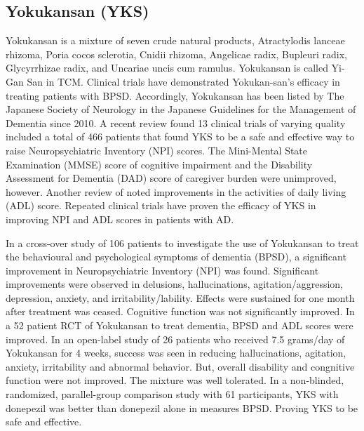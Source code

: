 \documentclass[twocolumn]{article}
\begin{document}

\subsection{Yokukansan (YKS)}
Yokukansan is a mixture of seven crude natural products,
Atractylodis lanceae rhizoma,
Poria cocos sclerotia,
Cnidii rhizoma,
Angelicae radix,
Bupleuri radix,
Glycyrrhizae radix,
and Uncariae uncis cum ramulus.
Yokukansan is called Yi-Gan San in TCM.
\cite{iwasaki2005randomized}
Clinical trials have demonstrated Yokukan-san’s efficacy
in treating patients with BPSD. Accordingly,
Yokukansan has been listed by The Japanese Society of Neurology
in the Japanese Guidelines for the Management of Dementia
since 2010.
A recent review found 13 clinical trials of varying quality
included a total of 466 patients that found YKS to be a safe
and effective way to raise Neuropsychiatric Inventory (NPI) scores.
The Mini-Mental State Examination (MMSE) score of cognitive impairment
and the Disability Assessment for Dementia (DAD) score of caregiver burden
were unimproved, however.
\cite{okamoto2014yokukan}
Another review of noted improvements in the activities of daily living (ADL) score.
\cite{matsuda2013yokukansan}
Repeated clinical trials have proven the efficacy of YKS in improving
NPI and ADL scores in patients with AD.
\cite{mizukami2014kampo}


In a cross-over study of 106 patients to investigate the use of Yokukansan
to treat the behavioural and psychological symptoms of dementia (BPSD),
a significant improvement in
Neuropsychiatric Inventory (NPI) was found.
Significant improvements were observed in delusions,
hallucinations, agitation/aggression, depression, anxiety, and irritability/lability.
Effects were sustained for one month after treatment was ceased.
Cognitive function was not significantly improved.
\cite{mizukami2009randomized}
In a 52 patient RCT of Yokukansan to treat dementia,
BPSD and ADL scores were improved.
\cite{iwasaki2005randomized}
In an open-label study of 26 patients who received
7.5 grams/day of Yokukansan for 4 weeks,
success was seen in reducing
hallucinations, agitation, anxiety, irritability
and abnormal behavior.
But, overall disability and congnitive function were not improved.
The mixture was well tolerated.
\cite{hayashi2010treatment}
In a non-blinded, randomized, parallel-group comparison study
with 61 participants, YKS with donepezil was better than donepezil alone
in measures BPSD. Proving YKS to be safe and effective.
\cite{okahara2010effects}
\end{document}

